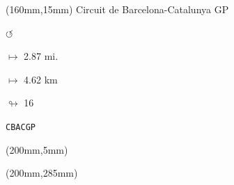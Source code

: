 \begin{textblock*}{40mm}(160mm,15mm)%
Circuit de Barcelona-Catalunya GP
\par \Huge$\circlearrowleft$
\Large
\par$\mapsto$ 2.87 mi.
\par$\mapsto$ 4.62 km
\par$\looparrowright$ 16
\par\hfill\tiny\tt CBACGP\\
\end{textblock*}
\begin{textblock*}{20mm}(200mm,5mm)%
\fbox{\thepage}
\end{textblock*}
\begin{textblock*}{20mm}(200mm,285mm)%
\fbox{\thepage}
\end{textblock*}
\null\newpage

